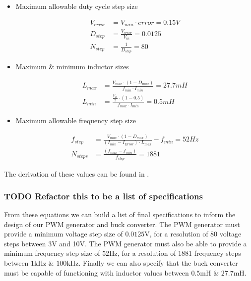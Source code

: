 \begin{itemize}
    \item Maximum allowable duty cycle step size

    \begin{align}
        V_{error} &= V_{min} \cdot error = 0.15V\\
        D_{step} &= \frac{V_{error}}{V_{in}} = 0.0125\\
        N_{step} &= \frac{1}{D_{step}} = 80 \label{E:duty_step}
    \end{align}

    \item Maximum \& minimum inductor sizes

    \begin{align}
        L_{max}&=\frac{V_{max}\cdot\left(1-D_{max}\right)}{f_{min}\cdot I_{min}} = 27.7mH \label{E:L_max}\\ 
        L_{min}&=\frac{\frac{V_{in}}{2}\cdot\left(1-0.5\right)}{f_{max}\cdot I_{min}} = 0.5mH \label{E:L_min}
    \end{align}
    
    \item Maximum allowable frequency step size

    \begin{align}
        f_{step}&=\frac{V_{max}\cdot\left(1-D_{max}\right)}{\left(I_{min}-I_{Error}\right)\cdot L_{max}}-f_{min} = 52Hz\\
        N_{steps}&=\frac{\left(f_{max}-f_{min}\right)}{f_{step}} = 1881 \label{E:f_step}
    \end{align}

\end{itemize}

The derivation of these values can be found in .

\subsubsection{TODO Refactor this to be a list of specifications}
From these equations we can build a list of final specifications to inform the design of our PWM generator and buck converter. The PWM generator must provide a minimum voltage step size of $0.0125$V, for a resolution of 80 voltage steps between 3V and 10V. The PWM generator must also be able to provide a minimum frequency step size of $52$Hz, for a resolution of 1881 frequency steps between $1$kHz \& $100$kHz. Finally we can also specify that the buck converter must be capable of functioning with inductor values between $0.5$mH \& $27.7$mH. \\

